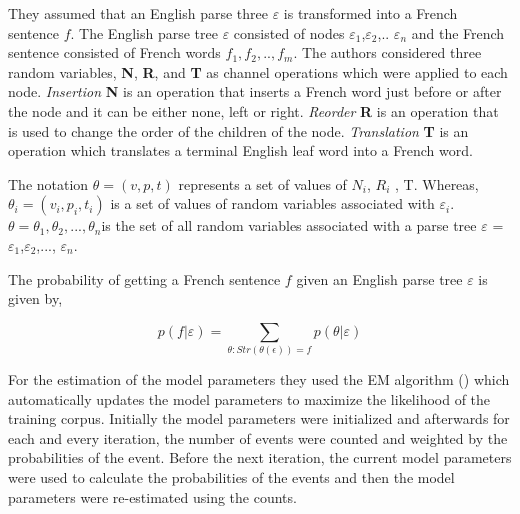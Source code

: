 They assumed that an English parse three $\varepsilon$  is transformed into a French sentence $f$. The English parse tree $\varepsilon$ consisted of nodes $\varepsilon_1$,$\varepsilon_2$,.. $\varepsilon_n$ and the French sentence consisted of French words $f_1,f_2,..,f_m$.
The authors considered three random variables, \textbf{N}, \textbf{R}, and \textbf{T} as channel operations which were applied to each node. \textit{Insertion} \textbf{N} is an operation that inserts a French word just before or after the node and it can be either none, left or right. \textit{Reorder} \textbf{R} is an operation that is used to change the order of the children of the node. \textit{Translation} \textbf{T} is an operation which translates a terminal English leaf word into a French word. 

The notation $ \theta = ( v, p,t )$  represents a  set of values of $N_i$, $R_i$ , T. Whereas, $ \theta_i = ( v_i, p_i,t_i )$  is a set of values of random variables associated with $\varepsilon_i$. $ \theta = \theta_1,\theta_2,...,\theta_n$is the set of all random variables associated with a parse tree $\varepsilon$ = $\varepsilon_1$,$\varepsilon_2$,..., $\varepsilon_n$.

 The probability of getting a French sentence $f$ given an English parse tree $\varepsilon$ is given by,
 
 \begin{equation}
     p(f|\varepsilon)=\sum_{\theta:Str(\theta(\epsilon))=f}p(\theta|\varepsilon)
 \end{equation}
 
For the estimation of the model parameters they used the EM algorithm (\cite{10.2307/2984875}) which automatically updates the model parameters to maximize the likelihood of the training corpus. Initially the model parameters were initialized and afterwards for each and every iteration, the number of events were counted and weighted by the probabilities of the event. Before the next iteration, the current model parameters were used to calculate the probabilities of the events and then the model parameters were re-estimated using the counts.

